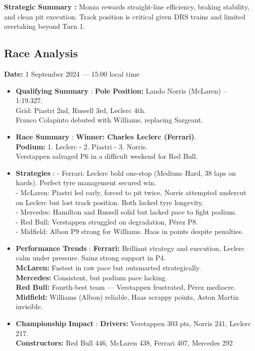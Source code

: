 \textbf{Strategic Summary :} Monza rewards straight-line efficiency, braking stability, and clean pit execution. Track position is critical given DRS trains and limited overtaking beyond Turn 1.


\subsection{Race Analysis}

\textbf{Date:} 1 September 2024 — 15:00 local time 

\begin{itemize}
    \item \textbf{Qualifying Summary} : \textbf{Pole Position:} Lando Norris (McLaren) – 1:19.327. \\
    Grid: Piastri 2nd, Russell 3rd, Leclerc 4th.\\
    Franco Colapinto debuted with Williams, replacing Sargeant.
    
    \item \textbf{Race Summary} : \textbf{Winner: Charles Leclerc (Ferrari)}. \\
    \textbf{Podium:} 1. Leclerc - 2. Piastri - 3. Norris. \\
    Verstappen salvaged P6 in a difficult weekend for Red Bull.
    
    \item \textbf{Strategies} : 
    - Ferrari: Leclerc bold one-stop (Medium–Hard, 38 laps on hards). Perfect tyre management secured win. \\
    - McLaren: Piastri led early, forced to pit twice, Norris attempted undercut on Leclerc but lost track position. Both lacked tyre longevity. \\
    - Mercedes: Hamilton and Russell solid but lacked pace to fight podium. \\
    - Red Bull: Verstappen struggled on degradation, Pérez P8. \\
    - Midfield: Albon P9 strong for Williams. Haas in points despite penalties.
    
    \item \textbf{Performance Trends} :  
    \textbf{Ferrari:} Brilliant strategy and execution, Leclerc calm under pressure. Sainz strong support in P4. \\
    \textbf{McLaren:} Fastest in raw pace but outsmarted strategically. \\
    \textbf{Mercedes:} Consistent, but podium pace lacking. \\
    \textbf{Red Bull:} Fourth-best team — Verstappen frustrated, Pérez mediocre. \\
    \textbf{Midfield:} Williams (Albon) reliable, Haas scrappy points, Aston Martin invisible.
    
    \item \textbf{Championship Impact} : \textbf{Drivers:} Verstappen 303 pts, Norris 241, Leclerc 217. \\
    \textbf{Constructors:} Red Bull 446, McLaren 438, Ferrari 407, Mercedes 292
\end{itemize}

